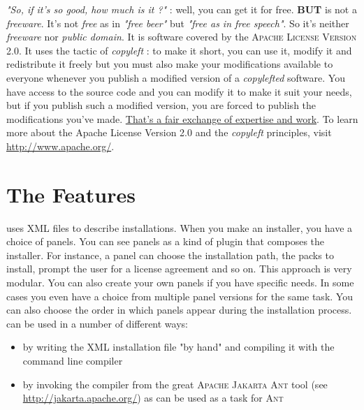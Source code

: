 \textit{"So, if it's so good, how much is it ?"} : well, you can get it
for free. \textbf{BUT} \IzPack is not a \textit{freeware}. It's not
\textit{free} as in \textit{"free beer"} but \textit{"free as in free
speech"}. So it's neither \textit{freeware} nor \textit{public domain}.
It is software covered by the \textsc{Apache License Version 2.0}.
It uses the tactic of \textit{copyleft} : to make it short, you can use
it, modify it and redistribute it freely but you must also make your
modifications available to everyone whenever you publish a modified
version of a \textit{copylefted} software. You have access to the
\IzPack source code and you can modify it to make it suit your needs,
but if you publish such a modified version, you are forced to publish
the modifications you've made. \underline{That's a fair exchange of
expertise and  work}. To learn more about the Apache License Version 2.0 and the
\textit{copyleft} principles, visit \mbox{\url{http://www.apache.org/}}.\\

\section*{The Features}

\IzPack uses XML files to describe installations. When you make an
installer, you have a choice of panels. You can see panels as a kind of
plugin that composes the installer. For instance, a panel can choose the
installation path, the packs to install, prompt the user for a license
agreement and so on. This approach is very modular. You can also create
your own panels if you have specific needs. In some cases you even have
a choice from multiple panel versions for the same task. You can also
choose the order in which panels appear during the installation process.
\IzPack can be used in a number of different ways:
\begin{itemize}
  \item by writing the XML installation file "by hand" and compiling
  it with the command line compiler
  \item by invoking the compiler from the great \textsc{Apache Jakarta
  Ant} tool (see \url{http://jakarta.apache.org/}) as \IzPack can be
  used as a task for \textsc{Ant}
\end{itemize}\

